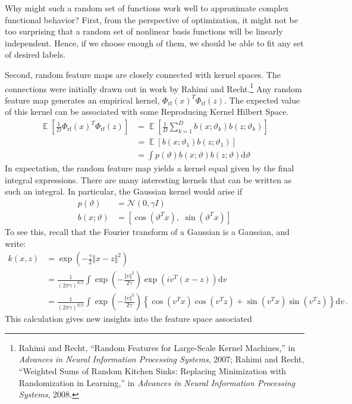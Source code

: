 \documentclass{tufte-book}
\begin{document}
Why might such a random set of functions work well to approximate
complex functional behavior? First, from the perspective of
optimization, it might not be too surprising that a random set of
nonlinear basis functions will be linearly independent. Hence, if we
choose enough of them, we should be able to fit any set of desired
labels.

Second, random feature maps are closely connected with kernel spaces.
The connections were initially drawn out in work by Rahimi and
Recht.\footnote{Rahimi and Recht, {``Random Features for Large-Scale
  Kernel Machines,''} in \emph{Advances in Neural Information Processing
  Systems}, 2007; Rahimi and Recht, {``Weighted Sums of Random Kitchen
  Sinks: Replacing Minimization with Randomization in Learning,''} in
  \emph{Advances in Neural Information Processing Systems}, 2008.} Any
random feature map generates an empirical kernel,
\(\Phi_{\text{rf}}(x)^T \Phi_{\text{rf}}(z)\). The expected value of
this kernel can be associated with some Reproducing Kernel Hilbert
Space. \[
\begin{aligned}
\mathop\mathbb{E}[\tfrac{1}{D} \Phi_{\text{rf}}(x)^T \Phi_{\text{rf}}(z) ]
&= \mathop\mathbb{E}\left[\frac{1}{D} \sum_{k=1}^D b(x;\vartheta_k) b(z;\vartheta_k) \right]\\
&= \mathop\mathbb{E}[b(x;\vartheta_1) b(z;\vartheta_1) ]\\
& = \int p(\vartheta) b(x;\vartheta) b(z;\vartheta) \mathrm{d}\vartheta
\end{aligned}
\] In expectation, the random feature map yields a kernel equal given by
the final integral expressions. There are many interesting kernels that
can be written as such an integral. In particular, the Gaussian kernel
would arise if \[
\begin{aligned}
p(\vartheta) &= \mathcal{N}(0,\gamma I)\\
b(x;\vartheta) &= [\cos(\vartheta^T x), \,\, \sin(\vartheta^T x)]
\end{aligned}
\] To see this, recall that the Fourier transform of a Gaussian is a
Gaussian, and write: \[
\begin{aligned}
    k(x,z) &= \exp(-\tfrac{\gamma}{2} \Vert x-z \Vert^2)\\
    &= \frac{1}{(2 \pi \gamma)^{d/2}}\int \exp \left(-\frac{ \Vert v\Vert^2}{2\gamma}\right) \exp(i v^T(x-z)) \mathrm{d} v\\
    &= \frac{1}{(2 \pi \gamma)^{d/2}}\int \exp \left(-\frac{ \Vert v\Vert^2}{2\gamma}\right) \left\{\cos(v^T x) \cos(v^Tz) + \sin(v^T x)\sin(v^Tz)\right\} \mathrm{d} v\,.
\end{aligned}
\] This calculation gives new insights into the feature space associated
\end{document}
